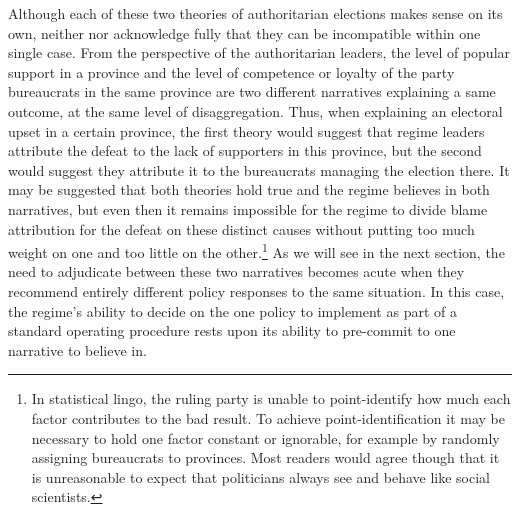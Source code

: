 \documentclass[12pt]{article}\usepackage[]{graphicx}\usepackage[]{color}
\newcommand{\1}{\mathbbm{1}}
\begin{document}
Although each of these two theories of authoritarian elections makes sense on its own, neither \cite{Magaloni2006} nor \cite{Blaydes2008} acknowledge fully that they can be incompatible within one single case. From the perspective of the authoritarian leaders, the level of popular support in a province and the level of competence or loyalty of the party bureaucrats in the same province are two different narratives explaining a same outcome, at the same level of disaggregation. Thus, when explaining an electoral upset in a certain province, the first theory would suggest that regime leaders attribute the defeat to the lack of supporters in this province, but the second would suggest they attribute it to the bureaucrats managing the election there. It may be suggested that both theories hold true and the regime believes in both narratives, but even then it remains impossible for the regime to divide blame attribution for the defeat on these distinct causes without putting too much weight on one and too little on the other.\footnote{In statistical lingo, the ruling party is unable to point-identify how much each factor contributes to the bad result. To achieve point-identification it may be necessary to hold one factor constant or ignorable, for example by randomly assigning bureaucrats to provinces. Most readers would agree though that it is unreasonable to expect that politicians always see and behave like social scientists.} As we will see in the next section, the need to adjudicate between these two narratives becomes acute when they recommend entirely different policy responses to the same situation. In this case, the regime's ability to decide on the one policy to implement as part of a standard operating procedure rests upon its ability to pre-commit to one narrative to believe in.


\end{document}
